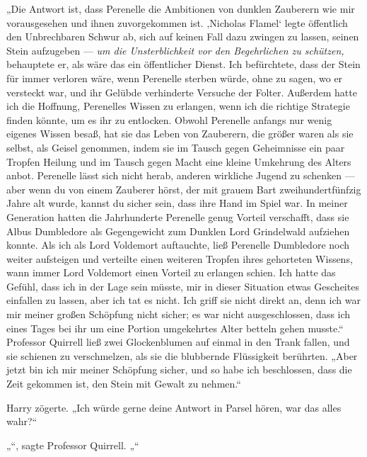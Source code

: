 „Die Antwort ist, dass Perenelle die Ambitionen von dunklen Zauberern wie mir vorausgesehen und ihnen zuvorgekommen ist. ‚Nicholas Flamel‘ legte öffentlich den Unbrechbaren Schwur ab, sich auf keinen Fall dazu zwingen zu lassen, seinen Stein aufzugeben — \emph{um die Unsterblichkeit vor den Begehrlichen zu schützen,} behauptete er, als wäre das ein öffentlicher Dienst. Ich befürchtete, dass der Stein für immer verloren wäre, wenn Perenelle sterben würde, ohne zu sagen, wo er versteckt war, und ihr Gelübde verhinderte Versuche der Folter. Außerdem hatte ich die Hoffnung, Perenelles Wissen zu erlangen, wenn ich die richtige Strategie finden könnte, um es ihr zu entlocken. Obwohl Perenelle anfangs nur wenig eigenes Wissen besaß, hat sie das Leben von Zauberern, die größer waren als sie selbst, als Geisel genommen, indem sie im Tausch gegen Geheimnisse ein paar Tropfen Heilung und im Tausch gegen Macht eine kleine Umkehrung des Alters anbot. Perenelle lässt sich nicht herab, anderen wirkliche Jugend zu schenken — aber wenn du von einem Zauberer hörst, der mit grauem Bart zweihundertfünfzig Jahre alt wurde, kannst du sicher sein, dass ihre Hand im Spiel war. In meiner Generation hatten die Jahrhunderte Perenelle genug Vorteil verschafft, dass sie Albus Dumbledore als Gegengewicht zum Dunklen Lord Grindelwald aufziehen konnte. Als ich als Lord Voldemort auftauchte, ließ Perenelle Dumbledore noch weiter aufsteigen und verteilte einen weiteren Tropfen ihres gehorteten Wissens, wann immer Lord Voldemort einen Vorteil zu erlangen schien. Ich hatte das Gefühl, dass ich in der Lage sein müsste, mir in dieser Situation etwas Gescheites einfallen zu lassen, aber ich tat es nicht. Ich griff sie nicht direkt an, denn ich war mir meiner großen Schöpfung nicht sicher; es war nicht ausgeschlossen, dass ich eines Tages bei ihr um eine Portion umgekehrtes Alter betteln gehen musste.“
Professor Quirrell ließ zwei Glockenblumen auf einmal in den Trank fallen, und sie schienen zu verschmelzen, als sie die blubbernde Flüssigkeit berührten.
„Aber jetzt bin ich mir meiner Schöpfung sicher, und so habe ich beschlossen, dass die Zeit gekommen ist, den Stein mit Gewalt zu nehmen.“

Harry zögerte.
„Ich würde gerne deine Antwort in Parsel hören, war das alles wahr?“

„“, sagte Professor Quirrell.
„“

